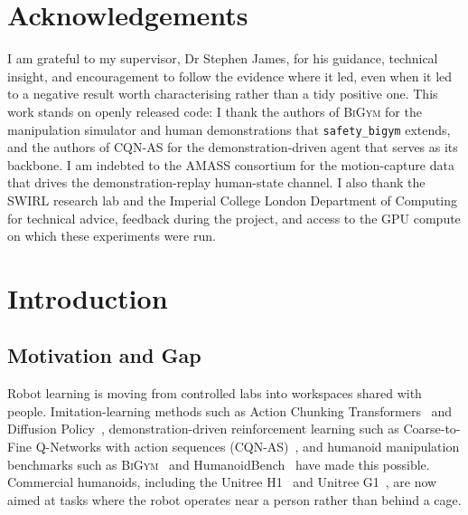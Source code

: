 \documentclass[11pt,a4paper]{report}
\newcommand{\bigym}{\textsc{BiGym}}
\newcommand{\sbigym}{\texttt{safety\_bigym}}
\newcommand{\cqnas}{CQN-AS}
\begin{document}
\tableofcontents
\listoffigures
\listoftables

\chapter*{Acknowledgements}
I am grateful to my supervisor, Dr Stephen James, for his guidance,
technical insight, and encouragement to follow the evidence where it
led, even when it led to a negative result worth characterising rather
than a tidy positive one. This work stands on openly released code: I
thank the authors of \bigym{} for the manipulation simulator and human
demonstrations that \sbigym{} extends, and the authors of \cqnas{} for
the demonstration-driven agent that serves as its backbone. I am
indebted to the \textsc{AMASS} consortium for the motion-capture data
that drives the demonstration-replay human-state channel. I also thank
the SWIRL research lab and the Imperial College London Department of
Computing for technical advice, feedback during the project, and access
to the GPU compute on which these experiments were run.

\chapter{Introduction}
\label{ch:intro}

\section{Motivation and Gap}
\label{sec:intro:motivation}

Robot learning is moving from controlled labs into workspaces shared
with people. Imitation-learning methods such as Action Chunking
Transformers~\cite{zhao2023act} and Diffusion
Policy~\cite{chi2023diffusion}, demonstration-driven reinforcement
learning such as Coarse-to-Fine Q-Networks with action sequences
(\cqnas{})~\cite{seo2024cqnas,seo2025actionsequence}, and humanoid
manipulation benchmarks such as \bigym{}~\cite{chernyadev2024bigym}
and HumanoidBench~\cite{sferrazza2024humanoidbench} have made this
possible. Commercial humanoids, including the Unitree H1~\cite{unitree_h1}
and Unitree G1~\cite{unitree_g1}, are now aimed at tasks where the
robot operates near a person rather than behind a cage.
\end{document}
